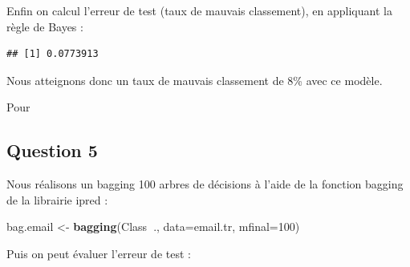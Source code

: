\documentclass[]{article}
\newenvironment{Shaded}{\begin{snugshade}}{\end{snugshade}}
\newcommand{\DataTypeTok}[1]{\textcolor[rgb]{0.13,0.29,0.53}{#1}}
\newcommand{\DecValTok}[1]{\textcolor[rgb]{0.00,0.00,0.81}{#1}}
\newcommand{\KeywordTok}[1]{\textcolor[rgb]{0.13,0.29,0.53}{\textbf{#1}}}
\newcommand{\NormalTok}[1]{#1}
\newcommand{\OperatorTok}[1]{\textcolor[rgb]{0.81,0.36,0.00}{\textbf{#1}}}
\newcommand{\StringTok}[1]{\textcolor[rgb]{0.31,0.60,0.02}{#1}}
\begin{document}
Enfin on calcul l'erreur de test (taux de mauvais classement), en
appliquant la règle de Bayes :

\begin{Shaded}
\end{Shaded}

\begin{verbatim}
## [1] 0.0773913
\end{verbatim}

Nous atteignons donc un taux de mauvais classement de 8\% avec ce
modèle.

Pour

\hypertarget{question-5}{%
\subsection{Question 5}\label{question-5}}

Nous réalisons un bagging 100 arbres de décisions à l'aide de la
fonction bagging de la librairie ipred :

\begin{Shaded}
\begin{Highlighting}[]
\NormalTok{bag.email <-}\StringTok{ }\KeywordTok{bagging}\NormalTok{(Class}\OperatorTok{~}\NormalTok{., }\DataTypeTok{data=}\NormalTok{email.tr, }\DataTypeTok{mfinal=}\DecValTok{100}\NormalTok{)}
\end{Highlighting}
\end{Shaded}

Puis on peut évaluer l'erreur de test :

\begin{Shaded}
\end{Shaded}
\end{document}
